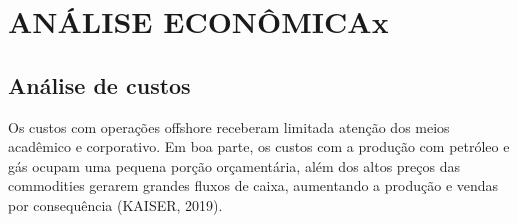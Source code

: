 %







\chapter{ANÁLISE ECONÔMICAx}
\label{chap:rsk}

\section{Análise de custos}
\label{sec:rskconc}
Os custos com operações offshore receberam limitada atenção dos meios acadêmico e corporativo. Em boa parte, os custos com a produção com petróleo e gás ocupam uma pequena porção orçamentária, além dos altos preços das commodities gerarem grandes fluxos de caixa, aumentando a produção e vendas por consequência (KAISER, 2019).

